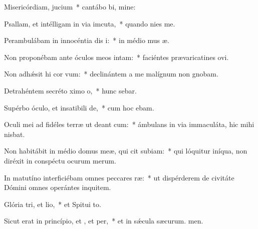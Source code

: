 \item Misericórdiam,  jucium~* cantábo bi, mine:
\item Psallam, et intélligam in via imcuta,~* quando nies  me.
\item Perambulábam in innocéntia dis i:~* in médio mus æ.
\item Non proponébam ante óculos meos  intam:~* faciéntes prævaricatines ovi.
\item Non adhǽsit hi cor vum:~* declinántem a me malígnum non gnobam.
\item Detrahéntem secréto ximo o,~* hunc sebar.
\item Supérbo óculo, et insatibili de,~* cum hoc  ebam.
\item Oculi mei ad fidéles terræ ut deant cum:~* ámbulans in via immaculáta, hic mihi nisbat.
\item Non habitábit in médio domus meæ, qui cit subiam:~* qui lóquitur iníqua, non diréxit in conspéctu ocurum merum.
\item In matutíno interficiébam omnes peccares ræ:~* ut dispérderem de civitáte Dómini omnes operántes inquitem.
\item Glória tri, et lio,~* et Spitui to.
\item Sicut erat in princípio, et , et per,~* et in sǽcula sæcurum. men.

